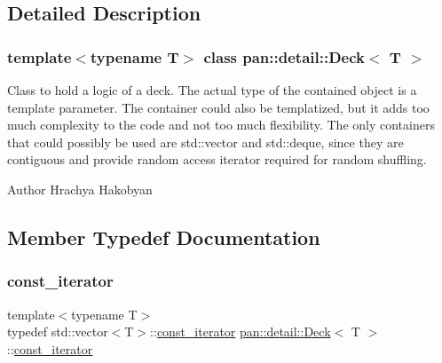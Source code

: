 \subsection{Detailed Description}
\subsubsection*{template$<$typename T$>$\newline
class pan\+::detail\+::\+Deck$<$ T $>$}

Class to hold a logic of a deck. The actual type of the contained object is a template parameter. The container could also be templatized, but it adds too much complexity to the code and not too much flexibility. The only containers that could possibly be used are std\+::vector and std\+::deque, since they are contiguous and provide random access iterator required for random shuffling. 

\begin{DoxyAuthor}{Author}
Hrachya Hakobyan 
\end{DoxyAuthor}


\subsection{Member Typedef Documentation}
\mbox{\label{classpan_1_1detail_1_1_deck_addc18d2f40aa396f6358bb019d088728}} 
\subsubsection{\texorpdfstring{const\+\_\+iterator}{const\_iterator}}
{\footnotesize\ttfamily template$<$typename T$>$ \\
typedef std\+::vector$<$T$>$\+::\hyperlink{classpan_1_1detail_1_1_deck_addc18d2f40aa396f6358bb019d088728}{const\+\_\+iterator} \hyperlink{classpan_1_1detail_1_1_deck}{pan\+::detail\+::\+Deck}$<$ T $>$\+::\hyperlink{classpan_1_1detail_1_1_deck_addc18d2f40aa396f6358bb019d088728}{const\+\_\+iterator}}

\mbox{\label{classpan_1_1detail_1_1_deck_a847d973e0469dd7aef881b3863c37cff}} 
